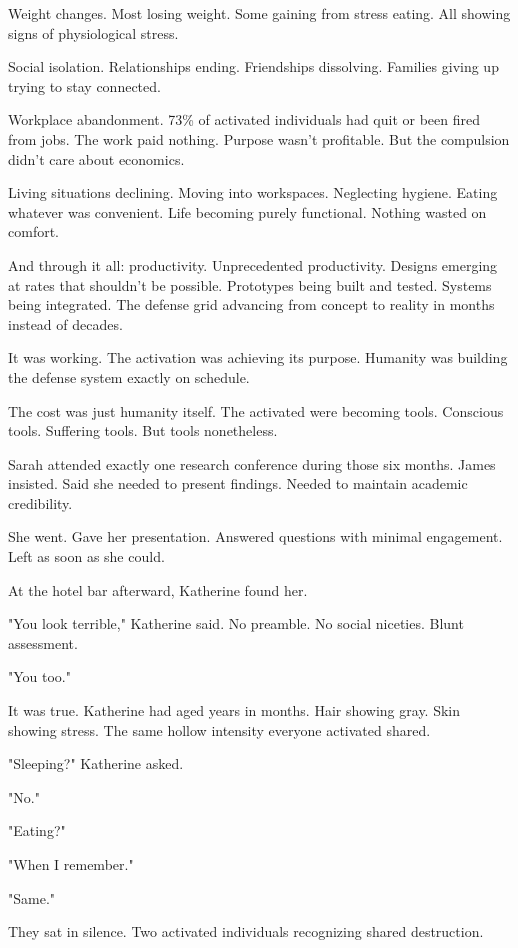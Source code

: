 Weight changes. Most losing weight. Some gaining from stress eating. All showing signs of physiological stress.

Social isolation. Relationships ending. Friendships dissolving. Families giving up trying to stay connected.

Workplace abandonment. 73\% of activated individuals had quit or been fired from jobs. The work paid nothing. Purpose wasn't profitable. But the compulsion didn't care about economics.

Living situations declining. Moving into workspaces. Neglecting hygiene. Eating whatever was convenient. Life becoming purely functional. Nothing wasted on comfort.

And through it all: productivity. Unprecedented productivity. Designs emerging at rates that shouldn't be possible. Prototypes being built and tested. Systems being integrated. The defense grid advancing from concept to reality in months instead of decades.

It was working. The activation was achieving its purpose. Humanity was building the defense system exactly on schedule.

The cost was just humanity itself. The activated were becoming tools. Conscious tools. Suffering tools. But tools nonetheless.

\scenebreak

Sarah attended exactly one research conference during those six months. James insisted. Said she needed to present findings. Needed to maintain academic credibility.

She went. Gave her presentation. Answered questions with minimal engagement. Left as soon as she could.

At the hotel bar afterward, Katherine found her.

"You look terrible," Katherine said. No preamble. No social niceties. Blunt assessment.

"You too."

It was true. Katherine had aged years in months. Hair showing gray. Skin showing stress. The same hollow intensity everyone activated shared.

"Sleeping?" Katherine asked.

"No."

"Eating?"

"When I remember."

"Same."

They sat in silence. Two activated individuals recognizing shared destruction.

